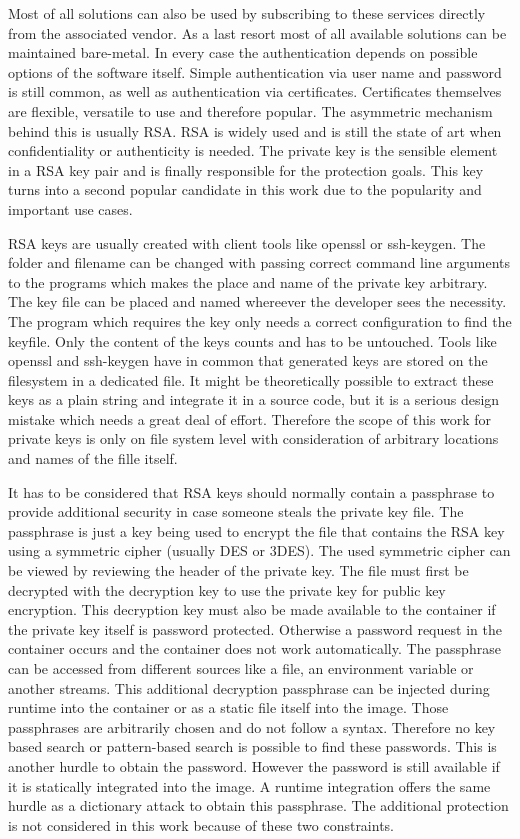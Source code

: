 Most of all solutions can also be used by subscribing to these services directly from the associated vendor.
As a last resort most of all available solutions can be maintained bare-metal.
In every case the authentication depends on possible options of the software itself. 
Simple authentication via user name and password is still common, as well as authentication via certificates.
Certificates themselves are flexible, versatile to use and therefore popular. 
The asymmetric mechanism behind this is usually RSA. 
RSA is widely used and is still the state of art when confidentiality or authenticity is needed. 
The private key is the sensible element in a RSA key pair and is finally responsible for the protection goals.
This key turns into a second popular candidate in this work due to the popularity and important use cases.

RSA keys are usually created with client tools like openssl or ssh-keygen.
The folder and filename can be changed with passing correct command line arguments to the programs which makes the place and name of the private key arbitrary.
The key file can be placed and named whereever the developer sees the necessity. 
The program which requires the key only needs a correct configuration to find the keyfile. 
Only the content of the keys counts and has to be untouched. 
Tools like openssl and ssh-keygen have in common that generated keys are stored on the filesystem in a dedicated file. 
It might be theoretically possible to extract these keys as a plain string and integrate it in a source code, but it is a serious design mistake which needs a great deal of effort. 
Therefore the scope of this work for private keys is only on file system level with consideration of arbitrary locations and names of the fille itself.

It has to be considered that RSA keys should normally contain a passphrase to provide additional security in case someone steals the private key file.
The passphrase is just a key being used to encrypt the file that contains the RSA key using a symmetric cipher (usually DES or 3DES). 
The used symmetric cipher can be viewed by reviewing the header of the private key. 
The file must first be decrypted with the decryption key to use the private key for public key encryption.
This decryption key must also be made available to the container if the private key itself is password protected.
Otherwise a password request in the container occurs and the container does not work automatically.
The passphrase can be accessed from different sources like a file, an environment variable or another streams.
This additional decryption passphrase can be injected during runtime into the container or as a static file itself into the image. 
Those passphrases are arbitrarily chosen and do not follow a syntax.
Therefore no key based search or pattern-based search is possible to find these passwords. 
This is another hurdle to obtain the password. 
However the password is still available if it is statically integrated into the image. 
A runtime integration offers the same hurdle as a dictionary attack to obtain this passphrase.
The additional protection is not considered in this work because of these two constraints.
 
